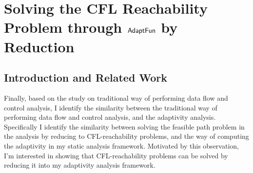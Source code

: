\section{Solving the CFL Reachability Problem through $\textsf{AdaptFun}$ by Reduction}
\label{ch:cfl_reduction}
\subsection{Introduction and Related Work}
\label{subsec:cfl-backgroung}
Finally, based on the study on traditional way of performing data flow and control analysis,
   I identify the similarity between the traditional way of performing data flow and control analysis, and the 
   adaptivity analysis.  
   Specifically I identify the similarity between 
   solving the feasible path problem in the analysis by reducing to CFL-reachability problems,
   and the way of computing the adaptivity in my static analysis framework.
   Motivated by this observation, 
   I'm interested in showing that
   CFL-reachability problems can be solved by reducing it into my adaptivity analysis framework.

